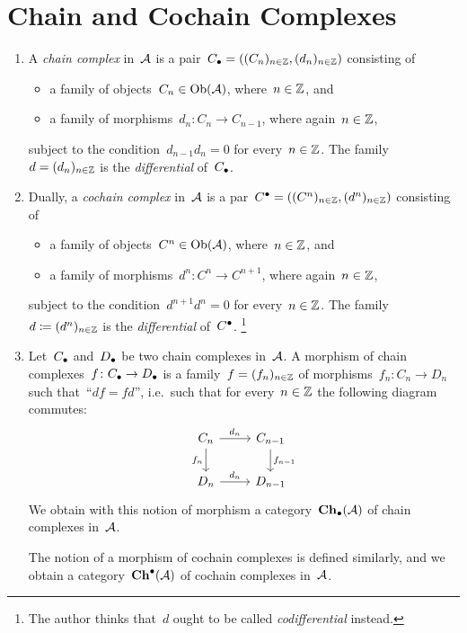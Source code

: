 \section{Chain and Cochain Complexes}


\begin{definition}
  \leavevmode
  \begin{enumerate}
    \item
      A \emph{chain complex} in~$\mathcal{A}$ is a pair~$C_\bullet = ( (C_n)_{n \in \mathbb{Z}}, (d_n)_{n \in \mathbb{Z}} )$ consisting of
      \begin{itemize}
        \item
          a family of objects~$C_n \in \operatorname{Ob}(\mathcal{A})$, where~$n \in \mathbb{Z}$, and
        \item
          a family of morphisms~$d_n \colon C_n \to C_{n-1}$, where again~$n \in \mathbb{Z}$,
      \end{itemize}
      subject to the condition~$d_{n-1} d_n = 0$ for every~$n \in \mathbb{Z}$.
      The family~$d = (d_n)_{n \in \mathbb{Z}}$ is the \emph{differential} of~$C_\bullet$.
    \item
      Dually, a \emph{cochain complex} in~$\mathcal{A}$ is a par~$C^\bullet = ( (C^n)_{n \in \mathbb{Z}}, (d^n)_{n \in \mathbb{Z}} )$ consisting of
      \begin{itemize}
        \item
          a family of objects~$C^n \in \operatorname{Ob}(\mathcal{A})$, where~$n \in \mathbb{Z}$, and
        \item
          a family of morphisms~$d^n \colon C^n \to C^{n+1}$, where again~$n \in \mathbb{Z}$,
      \end{itemize}
      subject to the condition~$d^{n+1} d^n = 0$ for every~$n \in \mathbb{Z}$.
      The family~$d \coloneqq (d^n)_{n \in \mathbb{Z}}$ is the \emph{differential} of~$C^\bullet$.%
      \footnote{The author thinks that~$d$ ought to be called \emph{codifferential} instead.}
    \item
      Let~$C_\bullet$ and~$D_\bullet$ be two chain complexes in~$\mathcal{A}$.
      A morphism of chain complexes~$f \colon C_\bullet \to D_\bullet$ is a family~$f = (f_n)_{n \in \mathbb{Z}}$ of morphisms~$f_n \colon C_n \to D_n$ such that~\enquote{$df = fd$}, i.e.\ such that for every~$n \in \mathbb{Z}$ the following diagram commutes:
      \[
        \begin{tikzcd}
            C_n
            \arrow{r}[above]{d_n}
            \arrow{d}[left]{f_n}
          & C_{n-1}
            \arrow{d}[right]{f_{n-1}}
          \\
            D_n
            \arrow{r}[above]{d_n}
          & D_{n-1}
        \end{tikzcd}
      \]
      We obtain with this notion of morphism a category~$\mathbf{Ch}_\bullet(\mathcal{A})$ of chain complexes in~$\mathcal{A}$.
      
      The notion of a morphism of cochain complexes is defined similarly, and we obtain a category~$\mathbf{Ch}^\bullet(\mathcal{A})$ of cochain complexes in~$\mathcal{A}$.
  \end{enumerate}
\end{definition}


